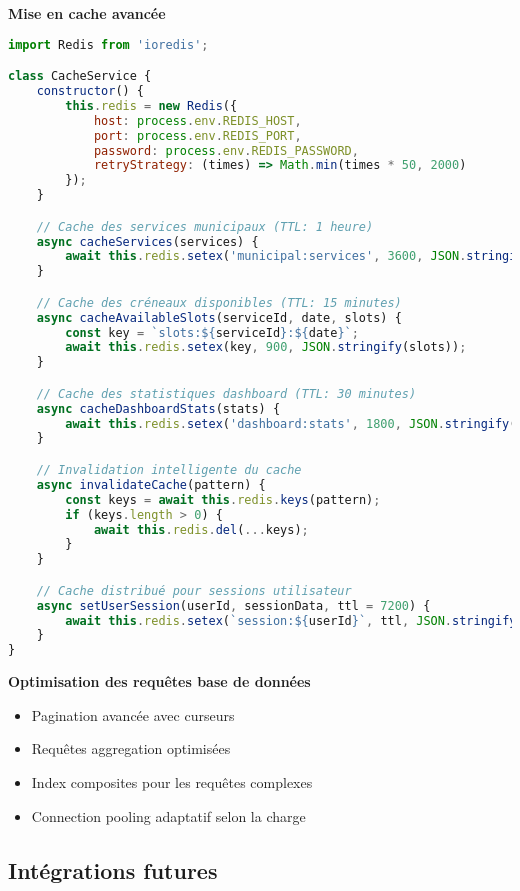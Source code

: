 \textbf{Mise en cache avancée}
\begin{lstlisting}[language=JavaScript, caption=Stratégie de cache Redis]
import Redis from 'ioredis';

class CacheService {
    constructor() {
        this.redis = new Redis({
            host: process.env.REDIS_HOST,
            port: process.env.REDIS_PORT,
            password: process.env.REDIS_PASSWORD,
            retryStrategy: (times) => Math.min(times * 50, 2000)
        });
    }

    // Cache des services municipaux (TTL: 1 heure)
    async cacheServices(services) {
        await this.redis.setex('municipal:services', 3600, JSON.stringify(services));
    }

    // Cache des créneaux disponibles (TTL: 15 minutes)
    async cacheAvailableSlots(serviceId, date, slots) {
        const key = `slots:${serviceId}:${date}`;
        await this.redis.setex(key, 900, JSON.stringify(slots));
    }

    // Cache des statistiques dashboard (TTL: 30 minutes)
    async cacheDashboardStats(stats) {
        await this.redis.setex('dashboard:stats', 1800, JSON.stringify(stats));
    }

    // Invalidation intelligente du cache
    async invalidateCache(pattern) {
        const keys = await this.redis.keys(pattern);
        if (keys.length > 0) {
            await this.redis.del(...keys);
        }
    }

    // Cache distribué pour sessions utilisateur
    async setUserSession(userId, sessionData, ttl = 7200) {
        await this.redis.setex(`session:${userId}`, ttl, JSON.stringify(sessionData));
    }
}
\end{lstlisting}

\textbf{Optimisation des requêtes base de données}
\begin{itemize}
\item Pagination avancée avec curseurs
\item Requêtes aggregation optimisées
\item Index composites pour les requêtes complexes
\item Connection pooling adaptatif selon la charge
\end{itemize}

\subsection{Intégrations futures}


